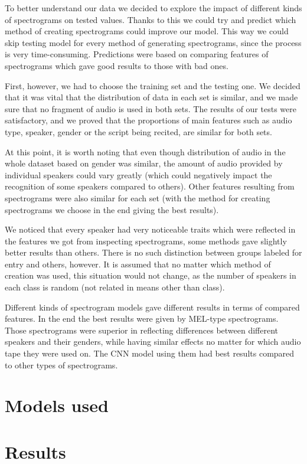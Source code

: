 \documentclass[11pt, letterpaper]{article}
\begin{document}
To better understand our data we decided to explore the impact of different kinds of spectrograms on tested values. Thanks to this we could try and predict which method of creating spectrograms could improve our model. This way we could skip testing model for every method of generating spectrograms, since the process is very time-consuming. Predictions were based on comparing features of spectrograms which gave good results to those with bad ones. 

First, however, we had to choose the training set and the testing one. We decided that it was vital that the distribution of data in each set is similar, and we made sure that no fragment of audio is used in both sets.  The results of our tests were satisfactory, and we proved that the proportions of main features such as audio type, speaker, gender or the script being recited, are similar for both sets.

At this point, it is worth noting that even though distribution of audio in the whole dataset based on gender was similar, the amount of audio provided by individual speakers could vary greatly (which could negatively impact the recognition of some speakers compared to others). Other features resulting from spectrograms were also similar for each set (with the method for creating spectrograms we choose in the end giving the best results). 

We noticed that every speaker had very noticeable traits which were reflected in the features we got from inspecting spectrograms, some methods gave slightly better results than others. There is no such distinction between groups labeled for entry and others, however. It is assumed that no matter which method of creation was used, this situation would not change, as the number of speakers in each class is random (not related in means other than class).

Different kinds of spectrogram models gave different results in terms of compared features. In the end the best results were given by MEL-type spectrograms. Those spectrograms were superior in reflecting differences between different speakers and their genders, while having similar effects no matter for which audio tape they were used on. The CNN model using them had best results compared to other types of spectrograms.

\section{Models used}
\section{Results}
\end{document}
